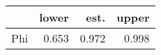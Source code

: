 \begin{table}[ht]
\centering
\begin{tabular}{rrrr}
  \hline
 & lower & est. & upper \\ 
  \hline
Phi & 0.653 & 0.972 & 0.998 \\ 
   \hline
\end{tabular}
\end{table}
